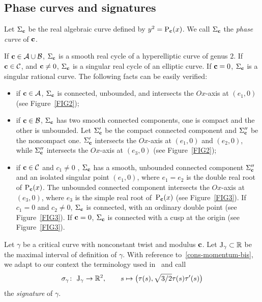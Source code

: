 \documentclass[pdftex]{sigma}
\numberwithin{equation}{section}
\def\R{\mathbb{R}}
\begin{document}
\subsection{Phase curves and signatures}%

\begin{Definition}
Let $\Sigma_{{\bf c}}$ be the {real} algebraic curve defined by $y^2={\rm P}_{\bf c}(x)$.
We call $\Sigma_{{\bf c}}$ the \emph{phase curve} of ${\bf c}$.
\end{Definition}

If ${\bf c}\in \mathcal A\cup \mathcal B$, $\Sigma_{{\bf c}}$ is a smooth real cycle of a hyperelliptic curve of genus $2$.
If ${\bf c}\in \mathcal C$, and ${\bf c}\neq 0$, $\Sigma_{{\bf c}}$ is a singular real cycle of an elliptic curve.
If ${\bf c}=0$, $\Sigma_{{\bf c}}$ is a singular rational curve.
{The following facts can be easily verified:}
\begin{itemize}\itemsep=0pt

\item if ${\bf c}\in {\mathcal A}$, $\Sigma_{{\bf c}}$ is connected, unbounded, and intersects the $Ox$-axis at $(e_1,0)$
(see Figure~\ref{FIG2});

\item if ${\bf c}\in {\mathcal B}$, $\Sigma_{{\bf c}}$ has two smooth connected components, one is compact and the other
is unbounded. Let $\Sigma'_{{\bf c}}$ be the compact connected component and $\Sigma''_{{\bf c}}$ be the noncompact one.
$\Sigma'_{{\bf c}}$ intersects the $Ox$-axis at $(e_1,0)$ and $(e_2,0)$, while $\Sigma''_{{\bf c}}$ intersects
the $Ox$-axis at $(e_3,0)$ (see Figure~\ref{FIG2});

\item if ${\bf c}\in {\mathcal C}$ and $c_1 \neq 0$ , $\Sigma_{{\bf c}}$ has a smooth, unbounded connected
component $\Sigma''_{{\bf c}}$ and an isolated singular point $(e_1,0)$, where $e_1=e_2$ is the double real root
of ${\rm P}_{\bf c}(x)$.
The unbounded connected component intersects the $Ox$-axis at $(e_3,0)$, where $e_3$ is the simple real root
of~${\rm P}_{\bf c}(x)$ (see Figure~\ref{FIG3}). If $c_1=0$ and $c_2\neq0$, $\Sigma_{{\bf c}}$ is connected, with
an ordinary double point (see Figure~\ref{FIG3}). If ${\bf c}=0$, $\Sigma_{{\bf c}}$ is connected with a cusp
at the origin (see Figure~\ref{FIG3}).
\end{itemize}

\begin{Definition}
Let $\gamma$ be a critical curve with nonconstant twist and modulus ${\bf c}$. Let ${\rm J}_{\gamma}\subset \R$ be
the maximal interval of definition of $\gamma$.
%
%
With reference to~\eqref{cons-momentum-bis}, we adapt to our context the terminology used in~\cite{COST,KRV,MNJMIV}
and call
\[
\sigma_{\gamma} \colon \ {\rm J}_{\gamma} \to \R^2, \qquad s\mapsto \big(\tau(s),\sqrt{3/2} \tau(s){\tau'}(s)\big)
\]
the \emph{signature} of $\gamma$.
\end{Definition}
\end{document}
